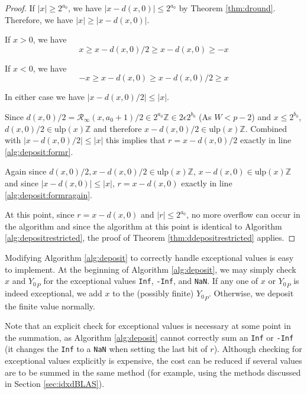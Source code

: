 \documentclass[12pt]{article}
\providecommand{\Z}{\ensuremath{\mathbb{Z}}}
\providecommand{\ulp}{\ensuremath{\text{ulp}}}
\providecommand{\roundtonearestinfty}{\ensuremath{\mathcal{R}_\text{$\infty$}}}
\theoremstyle{definition}
\numberwithin{equation}{section}
\numberwithin{figure}{section}
\begin{document}
\begin{proof}
        If $|x| \geq 2^{a_0}$, we have $|x - d(x, 0)| \leq 2^{a_0}$ by Theorem \ref{thm:dround}. Therefore, we have $|x| \geq |x - d(x, 0)|$. 

        If $x > 0$, we have
        \begin{equation*}
          x \geq x - d(x, 0)/2 \geq x - d(x, 0) \geq -x
        \end{equation*}

         If $x < 0$, we have
        \begin{equation*}
          -x \geq x - d(x, 0) \geq x - d(x, 0)/2 \geq x
        \end{equation*}

        In either case we have $|x - d(x, 0)/2| \leq |x|$.

        Since $d(x, 0)/2 = \roundtonearestinfty(x, a_0 + 1)/2 \in 2^{a_0}\Z \in 2  \epsilon  2^{b_0}$ (As $W < p - 2$) and $x \leq 2^{b_0}$, $d(x, 0)/2 \in \ulp(x)\Z$ and therefore $x - d(x, 0)/2 \in \ulp(x)\Z$. Combined with $|x - d(x, 0)/2| \leq |x|$ this implies that $r = x - d(x, 0)/2$ exactly in line \ref{alg:deposit:formr}.

        Again since $d(x, 0)/2, x - d(x, 0)/2 \in \ulp(x)\Z$, $x - d(x, 0) \in \ulp(x)\Z$ and since $|x - d(x, 0)| \leq |x|$, $r = x - d(x, 0)$ exactly in line \ref{alg:deposit:formragain}.

        At this point, since $r = x - d(x, 0)$ and $|r| \leq 2^{a_0}$, no more overflow can occur in the algorithm and since the algorithm at this point is identical to Algorithm \ref{alg:depositrestricted}, the proof of Theorem \ref{thm:ddepositrestricted} applies.
      \end{proof}

      Modifying Algorithm \ref{alg:deposit} to correctly handle exceptional values is easy to implement. At the beginning of Algorithm \ref{alg:deposit}, we may simply check $x$ and ${Y_0}_P$ for the exceptional values \texttt{Inf}, \texttt{-Inf}, and \texttt{NaN}. If any one of $x$ or ${Y_0}_P$ is indeed exceptional, we add $x$ to the (possibly finite) ${Y_0}_P$. Otherwise, we deposit the finite value normally.

      Note that an explicit check for exceptional values is necessary at some point in the summation, as Algorithm \ref{alg:deposit} cannot correctly sum an \texttt{Inf} or \texttt{-Inf} (it changes the \texttt{Inf} to a \texttt{NaN} when setting the last bit of $r$). Although checking for exceptional values explicitly is expensive, the cost can be reduced if several values are to be summed in the same method (for example, using the methods discussed in Section \ref{sec:idxdBLAS}).
\end{document}
